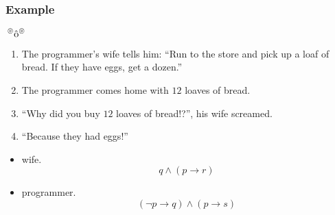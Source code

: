 \documentclass[UTF8,aspectratio=43,11pt,colorlinks,compress,openany]{beamer}%
\begin{document}
\begin{frame}\frametitle{Example}
	\begin{block}{$\sideset{^\circledcirc}{^\circledcirc}{\operatorname{\hat{o}}}$}
		\begin{enumerate}
			\item The programmer's wife tells him: ``Run to the store and pick up a loaf of bread. If they have eggs, get a dozen.''
			\item The programmer comes home with $12$ loaves of bread.
			\item ``Why did you buy $12$ loaves of bread!?'', his wife screamed.
			\item ``Because they had eggs!''
		\end{enumerate}	
	\end{block}
	\begin{itemize}
		\item wife.
		\[q\wedge(p\to r)\]
		\item programmer.
		\[(\neg p\to q)\wedge(p\to s)\]
	\end{itemize}
\end{frame}
\end{document}
